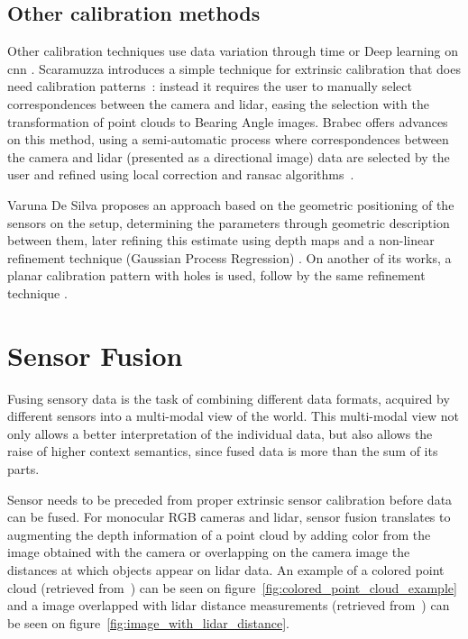 \subsection{Other calibration methods}
Other calibration techniques use data variation through time \cite{Chien2017} or Deep learning on \ac{cnn} \cite{Wang2018a}. Scaramuzza \etal introduces a simple technique for extrinsic calibration that does need calibration patterns~\cite{Scaramuzza}: instead it requires the user to manually select correspondences between the camera and \ac{lidar}, easing the selection with the transformation of point clouds to Bearing Angle images. Brabec offers advances on this method, using a semi-automatic process where correspondences between the camera and \ac{lidar} (presented as a directional image) data are selected by the user and refined using local correction and \ac{ransac} algorithms~\cite{brabec2014}.


Varuna De Silva \etal proposes an approach based on the geometric positioning of the sensors on the setup, determining the parameters through geometric description between them, later refining this estimate using depth maps and a non-linear refinement technique (Gaussian Process Regression) \cite{DeSilva2018}. On another of its works, a planar calibration pattern with holes is used, follow by the same refinement technique \cite{Silva2018}.


\section{Sensor Fusion}
Fusing sensory data is the task of combining different data formats, acquired by different sensors into a multi-modal view of the world. This multi-modal view not only allows a better interpretation of the individual data, but also allows the raise of higher context semantics, since fused data is more than the sum of its parts.

Sensor needs to be preceded from proper extrinsic sensor calibration before data can be fused. For monocular RGB cameras and \ac{lidar}, sensor fusion translates to augmenting the depth information of a point cloud by adding color from the image obtained with the camera or overlapping on the camera image the distances at which objects appear on \ac{lidar} data. An example of a colored point cloud (retrieved from~\cite{Gong2013}) can be seen on figure~\ref{fig:colored_point_cloud_example} and a image overlapped with \ac{lidar} distance measurements (retrieved from~\cite{Bileschi2009}) can be seen on figure~\ref{fig:image_with_lidar_distance}.

